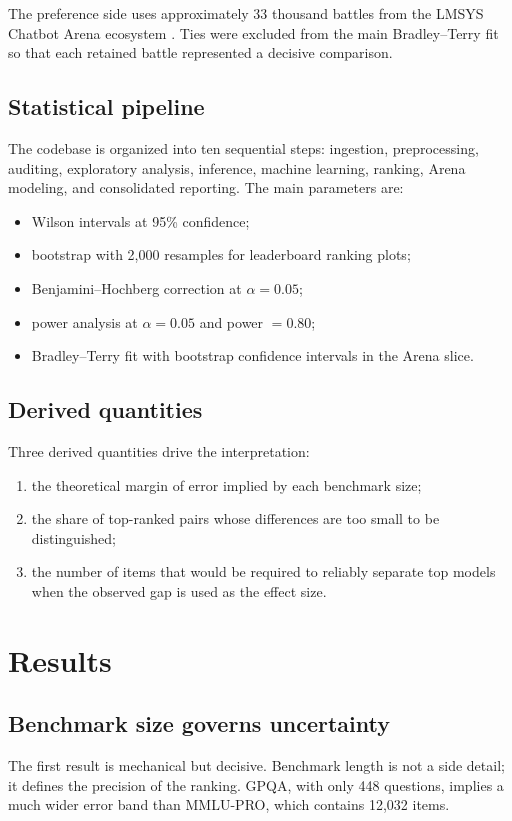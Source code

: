 \documentclass[11pt,a4paper]{article}
\begin{document}
The preference side uses approximately 33 thousand battles from the LMSYS Chatbot Arena ecosystem \citep{zheng2023arena,arena2026}. Ties were excluded from the main Bradley--Terry fit so that each retained battle represented a decisive comparison.

\subsection{Statistical pipeline}
The codebase is organized into ten sequential steps: ingestion, preprocessing, auditing, exploratory analysis, inference, machine learning, ranking, Arena modeling, and consolidated reporting. The main parameters are:
\begin{itemize}
    \item Wilson intervals at 95\% confidence;
    \item bootstrap with 2,000 resamples for leaderboard ranking plots;
    \item Benjamini--Hochberg correction at \(\alpha = 0.05\);
    \item power analysis at \(\alpha = 0.05\) and power \(= 0.80\);
    \item Bradley--Terry fit with bootstrap confidence intervals in the Arena slice.
\end{itemize}

\subsection{Derived quantities}
Three derived quantities drive the interpretation:
\begin{enumerate}
    \item the theoretical margin of error implied by each benchmark size;
    \item the share of top-ranked pairs whose differences are too small to be distinguished;
    \item the number of items that would be required to reliably separate top models when the observed gap is used as the effect size.
\end{enumerate}

\section{Results}

\subsection{Benchmark size governs uncertainty}
The first result is mechanical but decisive. Benchmark length is not a side detail; it defines the precision of the ranking. GPQA, with only 448 questions, implies a much wider error band than MMLU-PRO, which contains 12,032 items.
\end{document}
